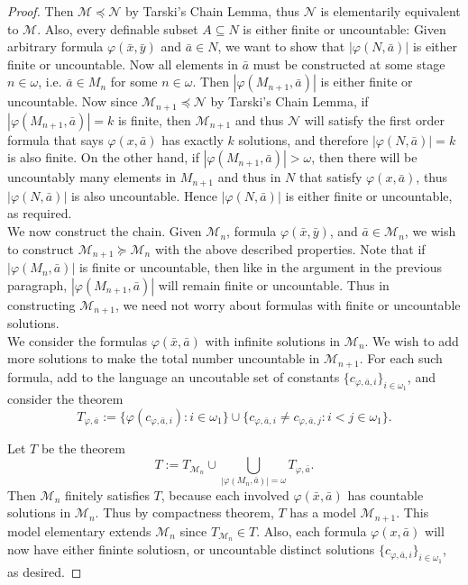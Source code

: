 \documentclass{article}
\begin{document}
\begin{enumerate}[label={\bf Q\arabic*:}]
\begin{proof}
      Then $\mathcal{M}\preceq\mathcal{N}$ by Tarski's Chain Lemma, thus
      $\mathcal{N}$ is elementarily equivalent to $\mathcal{M}$. Also,
      every definable subset $A\subseteq N$ is either finite or
      uncountable: Given arbitrary formula $\varphi(\bar{x},\bar{y})$ and
      $\bar{a}\in N$, we want to show that $|\varphi(N,\bar{a})|$ is
      either finite or uncountable. Now all elements in $\bar{a}$ must be
      constructed at some stage $n\in\omega$, i.e. $\bar{a}\in M_n$ for
      some $n\in\omega$. Then $|\varphi(M_{n+1},\bar{a})|$ is either finite
      or uncountable. Now since $\mathcal{M}_{n+1}\preceq\mathcal{N}$ by
      Tarski's Chain Lemma, if $|\varphi(M_{n+1},\bar{a})|=k$ is finite, then
      $\mathcal{M}_{n+1}$ and thus $\mathcal{N}$ will satisfy the first
      order formula that says $\varphi(x,\bar{a})$ has exactly $k$
      solutions, and therefore $|\varphi(N,\bar{a})|=k$ is also finite. On
      the other hand, if $|\varphi(M_{n+1},\bar{a})|>\omega$, then there
      will be uncountably many elements in $M_{n+1}$ and thus in $N$ that
      satisfy $\varphi(x,\bar{a})$, thus $|\varphi(N,\bar{a})|$ is also
      uncountable. Hence $|\varphi(N,\bar{a})|$ is either finite or
      uncountable, as required. \\

      We now construct the chain. Given $\mathcal{M}_n$, formula
      $\varphi(\bar{x},\bar{y})$, and $\bar{a}\in\mathcal{M}_n$, we wish to
      construct $\mathcal{M}_{n+1}\succeq\mathcal{M}_n$ with the above
      described properties. Note that if $|\varphi(M_n,\bar{a})|$ is finite
      or uncountable, then like in the argument in the previous paragraph,
      $|\varphi(M_{n+1},\bar{a})|$ will remain finite or uncountable. Thus
      in constructing $\mathcal{M}_{n+1}$, we need not worry about formulas
      with finite or uncountable solutions. \\

      We consider the formulas $\varphi(\bar{x},\bar{a})$ with infinite
      solutions in $\mathcal{M}_n$. We wish to add more solutions to make
      the total number uncountable in $\mathcal{M}_{n+1}$. For each such
      formula, add to the language an uncoutable set of constants
      $\{c_{\varphi,\bar{a},i}\}_{i\in\omega_1}$, and consider the theorem
      \[T_{\varphi,\bar{a}}:= \{\varphi(c_{\varphi,\bar{a},i}):
        i\in\omega_1\} \cup \{c_{\varphi,\bar{a},i}\neq
        c_{\varphi,\bar{a},j}: i<j\in\omega_1\}.\]

      Let $T$ be the theorem
      \[T:= T_{\mathcal{M}_n}\cup \bigcup_{|\varphi(M_n,\bar{a})|=\omega}
        T_{\varphi,\bar{a}}.\]
      Then $\mathcal{M}_n$ finitely satisfies $T$, because each involved
      $\varphi(\bar{x},\bar{a})$ has countable solutions in
      $\mathcal{M}_n$. Thus by compactness theorem, $T$ has a model
      $\mathcal{M}_{n+1}$. This model elementary extends $\mathcal{M}_n$
      since $T_{\mathcal{M}_n}\in T$. Also, each formula
      $\varphi(x,\bar{a})$ will now have either fininte solutiosn, or
      uncountable distinct solutions
      $\{c_{\varphi,\bar{a},i}\}_{i\in\omega_1}$, as desired.
    \end{proof}
\end{enumerate}
\end{document}

